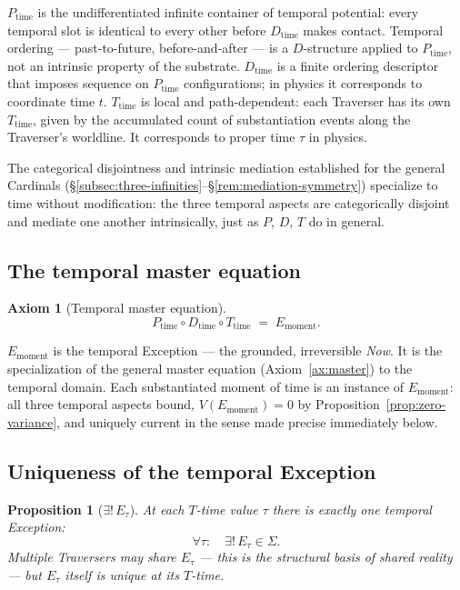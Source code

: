 \documentclass[11pt,a4paper]{article}
\newtheorem{proposition}[theorem]{Proposition}
\theoremstyle{definition}
\newtheorem{axiom}[theorem]{Axiom}
\theoremstyle{remark}
\begin{document}
$P_{\text{time}}$ is the undifferentiated infinite container of temporal potential: every temporal slot is identical to every other before $D_{\text{time}}$ makes contact. Temporal ordering --- past-to-future, before-and-after --- is a $D$-structure applied to $P_{\text{time}}$, not an intrinsic property of the substrate. $D_{\text{time}}$ is a finite ordering descriptor that imposes sequence on $P_{\text{time}}$ configurations; in physics it corresponds to coordinate time $t$. $T_{\text{time}}$ is local and path-dependent: each Traverser has its own $T_{\text{time}}$, given by the accumulated count of substantiation events along the Traverser's worldline. It corresponds to proper time $\tau$ in physics.

The categorical disjointness and intrinsic mediation established for the general Cardinals (\S\ref{subsec:three-infinities}--\S\ref{rem:mediation-symmetry}) specialize to time without modification: the three temporal aspects are categorically disjoint and mediate one another intrinsically, just as $P$, $D$, $T$ do in general.

\subsection{The temporal master equation}

\begin{axiom}[Temporal master equation]\label{ax:temporal-master}
\[
\boxed{\;P_{\text{time}} \circ D_{\text{time}} \circ T_{\text{time}} \;=\; E_{\text{moment}}.\;}
\]
\end{axiom}

$E_{\text{moment}}$ is the temporal Exception --- the grounded, irreversible \emph{Now}. It is the specialization of the general master equation (Axiom~\ref{ax:master}) to the temporal domain. Each substantiated moment of time is an instance of $E_{\text{moment}}$: all three temporal aspects bound, $V(E_{\text{moment}}) = 0$ by Proposition~\ref{prop:zero-variance}, and uniquely current in the sense made precise immediately below.

\subsection{Uniqueness of the temporal Exception}

\begin{proposition}[$\exists!\,E_{\tau}$]\label{prop:unique-E-tau}
At each $T$-time value $\tau$ there is exactly one temporal Exception:
\[
\forall \tau:\quad \exists!\, E_{\tau} \in \Sigma.
\]
Multiple Traversers may share $E_{\tau}$ --- this is the structural basis of shared reality --- but $E_{\tau}$ itself is unique at its $T$-time.
\end{proposition}
\end{document}
